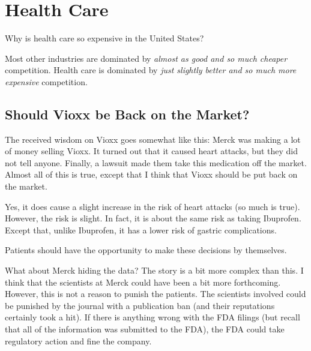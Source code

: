 \chapter{Health Care}
\label{chpt:health}

Why is health care so expensive in the United States?

Most other industries are dominated by \emph{almost as good and so much
cheaper} competition. Health care is dominated by \emph{just slightly better
and so much more expensive} competition.

\section{Should Vioxx be Back on the Market?}

The received wisdom on Vioxx goes somewhat like this: Merck was making a lot of
money selling Vioxx. It turned out that it caused heart attacks, but they did
not tell anyone. Finally, a lawsuit made them take this medication off the
market. Almost all of this is true, except that I think that Vioxx should be
put back on the market.

Yes, it does cause a slight increase in the risk of heart attacks (so much is
true). However, the risk is slight. In fact, it is about the same risk as
taking Ibuprofen. Except that, unlike Ibuprofen, it has a lower risk of gastric
complications.

Patients should have the opportunity to make these decisions by themselves.

What about Merck hiding the data? The story is a bit more complex than this. I
think that the scientists at Merck could have been a bit more forthcoming.
However, this is not a reason to punish the patients. The scientists involved
could be punished by the journal with a publication ban (and their reputations
certainly took a hit). If there is anything wrong with the FDA filings (but
recall that all of the information was submitted to the FDA), the FDA could
take regulatory action and fine the company.


